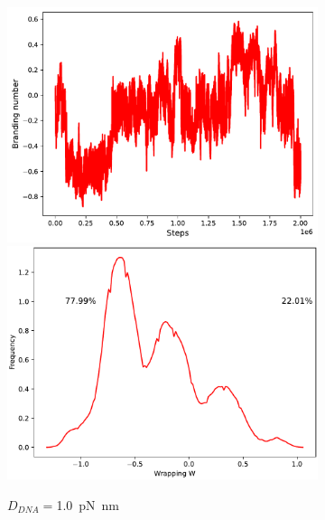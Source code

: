 \documentclass[a4paper,10pt]{article}
\begin{document}
\begin{figure}[htbp]
\begin{subfigure}{.3\textwidth}
\includegraphics[width=\textwidth]{brD_100_brand.pdf}
\includegraphics[width=\textwidth]{brD_100_br_pr.pdf}
\caption{$D_{DNA}=$\SI{1.0}{\pico\newton\nano\meter}}
\label{fig:braD_b}
\end{subfigure}
\begin{subfigure}{.3\textwidth}

\end{subfigure}
\end{figure}
\end{document}
